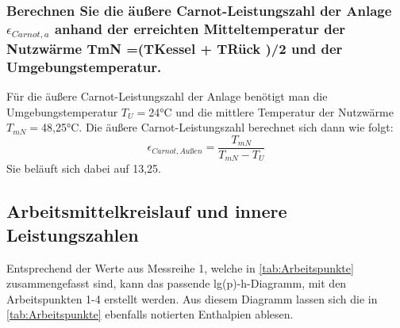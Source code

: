 \subsubsection{Berechnen Sie die äußere Carnot-Leistungszahl der Anlage $\epsilon_{Carnot,a}$ anhand der erreichten Mitteltemperatur der Nutzwärme TmN =(TKessel + TRück )/2 und der Umgebungstemperatur.}
Für die äußere Carnot-Leistungszahl der Anlage benötigt man die Umgebungstemperatur $T_{U}=$24°C und die mittlere Temperatur der Nutzwärme $T_{mN}=$48,25°C. Die äußere Carnot-Leistungszahl berechnet sich dann wie folgt: 
\begin{equation}
\epsilon_{Carnot, Außen} = \frac{T_{mN}}{T_{mN}-T_{U}}
\label{eq:110623_aeußere Carnot Leistungszahl}
\end{equation}
Sie beläuft sich dabei auf 13,25.

\subsection{Arbeitsmittelkreislauf und innere Leistungszahlen}
Entsprechend der Werte aus Messreihe 1, welche in \autoref{tab:Arbeitspunkte} zusammengefasst sind, kann das passende
lg(p)-h-Diagramm, mit den Arbeitspunkten 1-4 erstellt werden. Aus diesem Diagramm lassen sich die in \autoref{tab:Arbeitspunkte} ebenfalls
notierten Enthalpien ablesen.

\begin{table}[!h]
    \centering
    \caption{Arbeitspunkte entsprechend Messreihe 1}
    \label{tab:Arbeitspunkte}
    \end{table}

